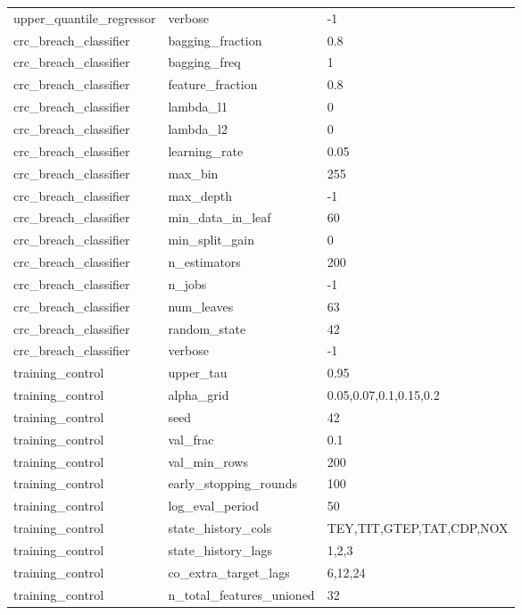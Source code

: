 \begin{tabular}{lll}
upper\_quantile\_regressor & verbose & -1 \\
crc\_breach\_classifier & bagging\_fraction & 0.8 \\
crc\_breach\_classifier & bagging\_freq & 1 \\
crc\_breach\_classifier & feature\_fraction & 0.8 \\
crc\_breach\_classifier & lambda\_l1 & 0 \\
crc\_breach\_classifier & lambda\_l2 & 0 \\
crc\_breach\_classifier & learning\_rate & 0.05 \\
crc\_breach\_classifier & max\_bin & 255 \\
crc\_breach\_classifier & max\_depth & -1 \\
crc\_breach\_classifier & min\_data\_in\_leaf & 60 \\
crc\_breach\_classifier & min\_split\_gain & 0 \\
crc\_breach\_classifier & n\_estimators & 200 \\
crc\_breach\_classifier & n\_jobs & -1 \\
crc\_breach\_classifier & num\_leaves & 63 \\
crc\_breach\_classifier & random\_state & 42 \\
crc\_breach\_classifier & verbose & -1 \\
training\_control & upper\_tau & 0.95 \\
training\_control & alpha\_grid & 0.05,0.07,0.1,0.15,0.2 \\
training\_control & seed & 42 \\
training\_control & val\_frac & 0.1 \\
training\_control & val\_min\_rows & 200 \\
training\_control & early\_stopping\_rounds & 100 \\
training\_control & log\_eval\_period & 50 \\
training\_control & state\_history\_cols & TEY,TIT,GTEP,TAT,CDP,NOX \\
training\_control & state\_history\_lags & 1,2,3 \\
training\_control & co\_extra\_target\_lags & 6,12,24 \\
training\_control & n\_total\_features\_unioned & 32 \\
\bottomrule
\end{tabular}
